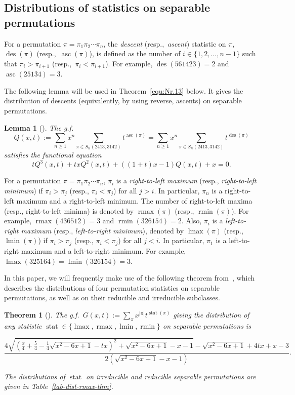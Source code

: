 \documentclass[10pt,a4paper]{article}
\DeclareMathOperator{\asc}{asc}
\DeclareMathOperator{\des}{des}
\DeclareMathOperator{\rmax}{rmax}
\DeclareMathOperator{\lmax}{lmax}
\DeclareMathOperator{\rmin}{rmin}
\DeclareMathOperator{\lmin}{lmin}
\newtheorem{thm}{Theorem}
\newtheorem{lemma}{Lemma}
\begin{document}
\subsection{Distributions of statistics on separable permutations}
For a permutation $\pi = \pi_1\pi_2\cdots \pi_n$, the \emph{descent} (resp.,\ \emph{ascent}) statistic on $\pi$, $\des(\pi)$ (resp.,\ $\asc(\pi)$), is defined as the number of $i \in \{1,2,\ldots,n-1\}$ such that $\pi_i > \pi_{i+1}$ (resp.,\ $\pi_i < \pi_{i+1}$). For example, $\des(561423)=2$ and $\asc(25134)=3$.

The following lemma will be used in Theorem~\ref{equ:Nr.13} below. It gives the distribution of descents (equivalently, by using reverse, ascents) on separable permutations.

\begin{lemma}[{\cite[Cor.~2.4]{fu2018two}}]\label{Sxt}
  The g.f.
  $$Q(x,t):=\sum_{n\ge1} x^n \sum_{\pi\in S_n(2413,3142)}
  t^{\asc(\pi)}=\sum_{n\ge1} x^n \sum_{\pi\in S_n(2413,3142)}
  t^{\des(\pi)}$$ satisfies the functional equation
  \begin{equation}\label{eq:Stq}
  	tQ^3(x,t) + txQ^2(x,t) + ((1+t)x - 1)Q(x,t) + x = 0. 
  \end{equation}
\end{lemma}
For a permutation $\pi = \pi_1 \pi_2 \cdots \pi_n$, 
$\pi_i$ is a \emph{right-to-left maximum} (resp., \emph{right-to-left minimum}) 
if $\pi_i > \pi_j$ (resp., $\pi_i < \pi_j$) for all $j > i$. In particular, $\pi_n$ is a right-to-left maximum and a right-to-left minimum. 
The number of right-to-left maxima (resp., right-to-left minima) is denoted by $\rmax(\pi)$ (resp., $\rmin(\pi)$). 
For example, $\rmax(436512) = 3$ and $\rmin(326154) = 2$. 
Also, $\pi_i$ is a \emph{left-to-right maximum} (resp., \emph{left-to-right minimum}), denoted by $\lmax(\pi)$ (resp., $\lmin(\pi)$) if $\pi_i > \pi_j$ (resp., $\pi_i < \pi_j$) for all $j < i$. In particular, $\pi_1$ is a left-to-right maximum and a left-to-right minimum. For example, $\lmax(325164) = \lmin(326154) = 3$.

In this paper, we will frequently make use of the following theorem from~\cite{CKZ2024}, which describes the distributions of four permutation statistics on separable permutations, as well as on their reducible and irreducible subclasses.

\begin{thm}[{\cite[Thm.~5]{CKZ2024}}]\label{four-stat}
	The g.f.\ $G(x,t) := \sum_{\pi} x^{|\pi|} t^{\operatorname{stat}(\pi)}$ 
	giving the distribution of any statistic 
	$\operatorname{stat} \in \{\lmax, \rmax, \lmin, \rmin\}$ 
	on separable permutations is
	\begin{small}
	\begin{equation}\label{eq:four-stat}
\frac{4\sqrt{\left(\frac{x}{4}+\frac{5}{4}-\frac{1}{4} \sqrt{x^2-6 x+1}-tx\right)^2+\sqrt{x^2-6 x+1}-x-1}-\sqrt{x^2-6 x+1}+4t x+x - 3}{2 \left(\sqrt{x^2-6 x+1}-x-1\right)}.
	\end{equation}
	\end{small}
	The distributions of $\operatorname{stat}$ on irreducible and reducible separable permutations 
	are given in Table~\ref{tab-dist-rmax-thm}.
\end{thm}
\end{document}
